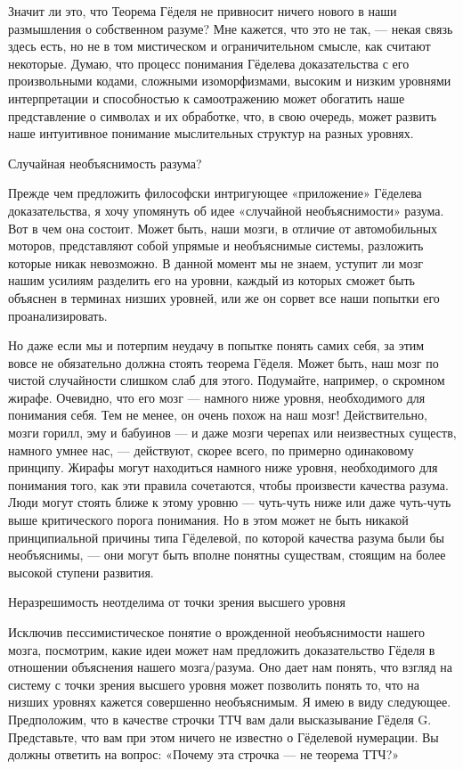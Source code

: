 Значит ли это, что Теорема Гёделя не привносит ничего нового в наши размышления о собственном разуме? Мне кажется, что это не так, --- некая связь здесь есть, но не в том мистическом и ограничительном смысле, как считают некоторые. Думаю, что процесс понимания Гёделева доказательства с его произвольными кодами, сложными изоморфизмами, высоким и низким уровнями интерпретации и способностью к самоотражению может обогатить наше представление о символах и их обработке, что, в свою очередь, может развить наше интуитивное понимание мыслительных структур на разных уровнях.

Случайная необъяснимость разума?

Прежде чем предложить философски интригующее «приложение» Гёделева доказательства, я хочу упомянуть об идее «случайной необъяснимости» разума. Вот в чем она состоит. Может быть, наши мозги, в отличие от автомобильных моторов, представляют собой упрямые и необъяснимые системы, разложить которые никак невозможно. В данной момент мы не знаем, уступит ли мозг нашим усилиям разделить его на уровни, каждый из которых сможет быть объяснен в терминах низших уровней, или же он сорвет все наши попытки его проанализировать.

Но даже если мы и потерпим неудачу в попытке понять самих себя, за этим вовсе не обязательно должна стоять теорема Гёделя. Может быть, наш мозг по чистой случайности слишком слаб для этого. Подумайте, например, о скромном жирафе. Очевидно, что его мозг --- намного ниже уровня, необходимого для понимания себя. Тем не менее, он очень похож на наш мозг! Действительно, мозги горилл, эму и бабуинов --- и даже мозги черепах или неизвестных существ, намного умнее нас, --- действуют, скорее всего, по примерно одинаковому принципу. Жирафы могут находиться намного ниже уровня, необходимого для понимания того, как эти правила сочетаются, чтобы произвести качества разума. Люди могут стоять ближе к этому уровню --- чуть-чуть ниже или даже чуть-чуть выше критического порога понимания. Но в этом может не быть никакой принципиальной причины типа Гёделевой, по которой качества разума были бы необъяснимы, --- они могут быть вполне понятны существам, стоящим на более высокой ступени развития.

Неразрешимость неотделима от точки зрения высшего уровня

Исключив пессимистическое понятие о врожденной необъяснимости нашего мозга, посмотрим, какие идеи может нам предложить доказательство Гёделя в отношении объяснения нашего мозга/разума. Оно дает нам понять, что взгляд на систему с точки зрения высшего уровня может позволить понять то, что на низших уровнях кажется совершенно необъяснимым. Я имею в виду следующее. Предположим, что в качестве строчки ТТЧ вам дали высказывание Гёделя G. Представьте, что вам при этом ничего не известно о Гёделевой нумерации. Вы должны ответить на вопрос: «Почему эта строчка --- не теорема ТТЧ?»

